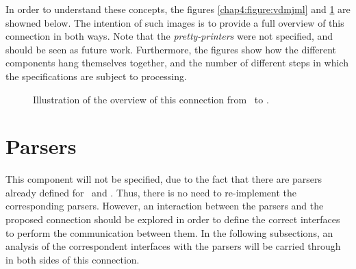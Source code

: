 In order to understand these concepts, the figures \ref{chap4:figure:vdmjml} and \ref{chap4:figure:jmlvdm} are showned below. The intention of such images is to provide a full overview of this connection in both ways. Note that the \textit{pretty-printers} were not specified, and should be seen as future work. Furthermore, the figures show how the different components hang themselves together, and the number of different steps in which the specifications are subject to processing. 


\begin{figure}[!htb]
\begin{center}
\end{center}
\caption{Illustration of the overview of this connection from \jml\ to \vpp.}
\label{chap4:figure:jmlvdm}
\end{figure}

\section{Parsers}
\label{chap4:sec:parsing}


This component will not be specified, due to the fact that there are parsers already defined for \vpp\ and \jml. Thus, there is no need to re-implement the corresponding parsers. However, an interaction between the parsers and the proposed connection should be explored in order to define the correct interfaces to perform the communication between them. In the following subsections, an analysis of the correspondent interfaces with the parsers will be carried through in both sides of this connection.


